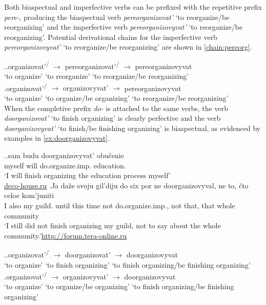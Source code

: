 Both biaspectual and imperfective verbs can be prefixed with the repetitive prefix \textit{pere-}, producing the biaspectual verb \textit{pereorganizovat'} `to reorganize/be reorganizing' and the imperfective verb \textit{pereorganizovyvat'} `to reorganize/be reorganizing'. Potential derivational chains for the imperfective verb \textit{pereorganizovyvat'} `to reorganize/be reorganizing' are shown in \ref{chain:pereorg}. 

\ex.\label{chain:pereorg}\ag.organizovat'\textsuperscript{\PF\slash\IPF} {$\rightarrow$} {pereorganizovat'\textsuperscript{\PF\slash\IPF}} {$\rightarrow$} pereorganizovyvat\textsuperscript{\IPF}\\
{`to organize'} {} {`to reorganize'} {} {`to reorganize/be reorganizing'}\\
\bg.organizovat'\textsuperscript{\PF\slash\IPF} {$\rightarrow$} {organizovyvat'\textsuperscript{\IPF}} {$\rightarrow$} pereorganizovyvat\textsuperscript{\IPF}\\
{`to organize'} {} {`to organize/be organizing'} {} {`to reorganize/be reorganizing'}\\

When the completive prefix \textit{do-} is attached to the same verbs, the verb \textit{doorganizovat'} `to finish organizing' is clearly perfective and the verb \textit{doorganizovyvat'} `to finish/be finishing organizing' is biaspectual, as evidenced by examples in \ref{ex:doorganizovyvat}.

\ex.\label{ex:doorganizovyvat}\ag.sam budu doorganizovyvat'\textsuperscript{\IPF} obu\v{c}enie\\
myself will do.organize.imp. education.\\
\trans `I will finish organizing the education process myself'\\\hbox{}\hfill\hbox{\url{deco-house.ru}}
\bg.Ja da\v{z}e svoju gil'diju do six por ne doorganizovyval\textsuperscript{\PF}, ne to, \v{c}to celoe kom'juniti\\
I also my guild. until this time not do.organize.imp., not that, that whole community\\
\trans `I still did not finish organizing my guild, not to say about the whole community.'\hbox{}\hfill\hbox{\url{http://forum.tera-online.ru}}

\ex.\label{chain:doorg}\ag.organizovat'\textsuperscript{\PF\slash\IPF} {$\rightarrow$} {doorganizovat'\textsuperscript{\PF}} {$\rightarrow$} doorganizovyvat\textsuperscript{\IPF}\\
{`to organize'} {} {`to finish organizing'} {} {`to finish organizing/be finishing organizing'}\\
\bg.organizovat'\textsuperscript{\PF\slash\IPF} {$\rightarrow$} {organizovyvat'\textsuperscript{\IPF}} {$\rightarrow$} doorganizovyvat\textsuperscript{\PF}\\
{`to organize'} {} {`to organize/be organizing'} {} {`to finish organizing/be finishing organizing'}\\

